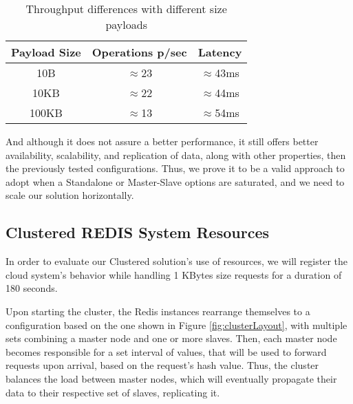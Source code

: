 \begin{table}[ht]
	\caption{Throughput differences with different size payloads} %
	\centering %
	\begin{tabular}{c c c } %
		\hline\hline %
		\textbf{Payload Size} & \textbf{Operations p/sec} & \textbf{Latency}\\ [0.5ex] %
		\hline
		10B & $\approx$23 & $\approx$43ms\\
		\hline
		10KB & $\approx$22 & $\approx$44ms\\
		\hline %
		100KB & $\approx$13 & $\approx$54ms\\ [1ex] %
		\hline %
	\end{tabular}
	\label{table:throughputPayloadsCluster} %
\end{table} 


And although it does not assure a better performance, it still offers better availability, scalability, and replication of data, along with other properties, then the previously tested configurations.
Thus, we prove it to be a valid approach to adopt when a Standalone or Master-Slave options are saturated, and we need to scale our solution horizontally.






\subsection{Clustered REDIS System Resources}

In order to evaluate our Clustered solution's use of resources, we will register the cloud system's behavior while handling 1 KBytes size requests for a duration of 180 seconds.



Upon starting the cluster, the Redis instances rearrange themselves to a configuration based on the one shown in Figure \ref{fig:clusterLayout}, with multiple sets combining a master node and one or more slaves. Then, each master node becomes responsible for a set interval of values, that will be used to forward requests upon arrival, based on the request's hash value. Thus, the cluster balances the load between master nodes, which will eventually propagate their data to their respective set of slaves, replicating it.


